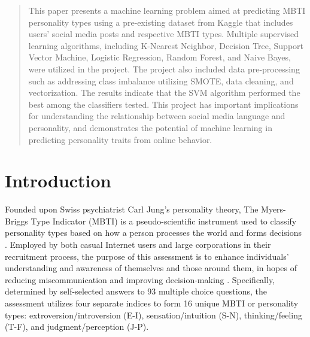 \documentclass{article}
\begin{document}

\begin{abstract}

This paper presents a machine learning problem aimed at predicting MBTI personality types using a pre-existing dataset from Kaggle that includes users’ social media posts and respective MBTI types. Multiple supervised learning algorithms, including K-Nearest Neighbor, Decision Tree, Support Vector Machine, Logistic Regression, Random Forest, and Naive Bayes, were utilized in the project. The project also included data pre-processing such as addressing class imbalance utilizing SMOTE, data cleaning, and vectorization. The results indicate that the SVM algorithm performed the best among the classifiers tested. This project has important implications for understanding the relationship between social media language and personality, and demonstrates the potential of machine learning in predicting personality traits from online behavior.

\end{abstract}

\section{Introduction}
\label{introduction}

Founded upon Swiss psychiatrist Carl Jung’s personality theory, The Myers-Briggs Type Indicator (MBTI) is a pseudo-scientific instrument used to classify personality types based on how a person processes the world and forms decisions \citep{mcleod23}. Employed by both casual Internet users and large corporations in their recruitment process, the purpose of this assessment is to enhance individuals’ understanding and awareness of themselves and those around them, in hopes of reducing miscommunication and improving decision-making \citep{myers-briggs}. Specifically, determined by self-selected answers to 93 multiple choice questions, the assessment utilizes four separate indices to form 16 unique MBTI or personality types: extroversion/introversion (E-I), sensation/intuition (S-N), thinking/feeling (T-F), and judgment/perception (J-P).
\end{document}
